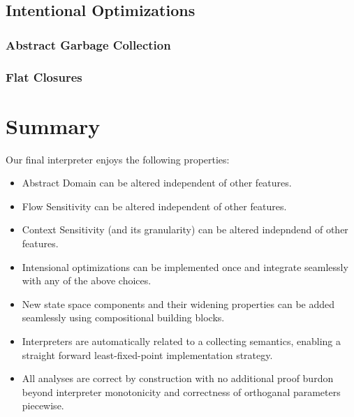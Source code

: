 \documentclass[pldi]{sigplanconf}
\begin{document}

\subsection{Intentional Optimizations}

\subsubsection{Abstract Garbage Collection}

\subsubsection{Flat Closures}



\section{Summary}

Our final interpreter enjoys the following properties:
\begin{itemize}
\item Abstract Domain can be altered independent of other features.
\item Flow Sensitivity can be altered independent of other features.
\item Context Sensitivity (and its granularity) can be altered indepndend of other features.
\item Intensional optimizations can be implemented once and integrate seamlessly with any of the above choices.
\item New state space components and their widening properties can be added seamlessly using compositional building blocks.
\item Interpreters are automatically related to a collecting semantics, enabling a straight forward least-fixed-point implementation strategy.
\item All analyses are correct by construction with no additional proof burdon beyond interpreter monotonicity and correctness of orthoganal parameters piecewise.
\end{itemize}

\end{document}
